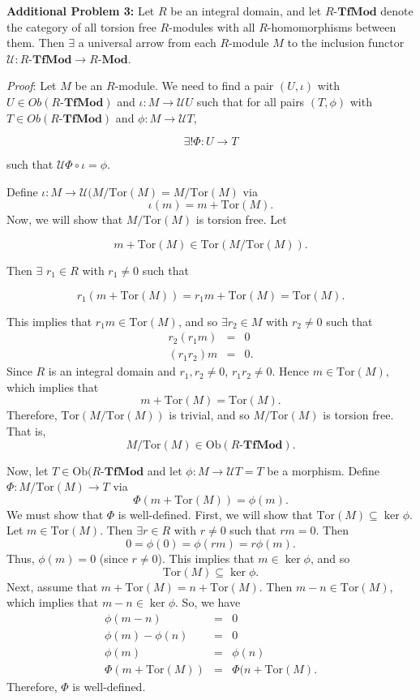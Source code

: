 \documentclass{article}
\newcommand{\Tor}{\textrm{Tor}}
\newcommand{\Ob}{\textrm{Ob}}
\begin{document}
\begin{flushleft}
\bigskip

\textbf{Additional Problem 3:} Let $R$ be an integral domain, and let $R\textrm{-}\mathbf{TfMod}$ denote the category of all torsion free $R$-modules with all $R$-homomorphisms between them.  Then $\exists$ a universal arrow from each $R$-module $M$ to the inclusion functor $\mathcal{U}:R\textrm{-}\mathbf{TfMod}\rightarrow R\textrm{-}\mathbf{Mod}$.

\medskip

\textit{Proof}: Let $M$ be an $R$-module.  We need to find a pair $(U,\iota)$ with $U \in 
Ob(R\textrm{-}\mathbf{TfMod})$ and $\iota:M\rightarrow\mathcal{U}U$ such that for all pairs $(T,\phi)$ with $T \in Ob(R\textrm{-}\mathbf{TfMod})$ and $\phi:M\rightarrow\mathcal{U}T$,

$$\exists!  \Phi:U\rightarrow T$$

such that $\mathcal{U}\Phi \circ \iota=\phi$.

\medskip

Define $\iota :M\rightarrow\mathcal{U}(M/\Tor(M)=M/\Tor(M)$ via 
$$\iota(m)=m+\Tor(M).$$
Now, we will show that $M/\Tor(M)$ is torsion free.  Let 

$$m+\Tor(M) \in \Tor(M/\Tor(M)).$$

 Then $\exists$ $r_1 \in R$ with $r_1\neq 0$ such that 
 
 $$r_1(m+\Tor(M))=r_1m+\Tor(M)=\Tor(M).$$
 
 This implies that $r_1m\in \Tor(M)$, and so $\exists r_2\in M$ with $r_2\neq 0$ such that 
 \begin{eqnarray*}
 r_2(r_1m)&=&0\\
 (r_1r_2)m&=&0.
 \end{eqnarray*}
 Since $R$ is an integral domain and $r_1,r_2\neq 0$, $r_1r_2\neq 0$.  Hence $m\in \Tor(M)$, which implies that
 $$m+\Tor(M)=\Tor(M).$$
 Therefore, $\Tor(M/\Tor(M))$ is trivial, and so $M/\Tor(M)$ is torsion free.  That is, 
 $$M/\Tor(M) \in \Ob(R\textrm{-}\mathbf{TfMod}).$$
 
 \medskip
 
 Now, let $T \in \Ob(R\textrm{-}\mathbf{TfMod}$ and let $\phi:M\rightarrow\mathcal{U}T=T$ be a morphism.  Define $\Phi:M/\Tor(M)\rightarrow T$ via
 $$\Phi(m+\Tor(M))=\phi(m).$$
 We must show that $\Phi$ is well-defined.  First, we will show that $\Tor(M)\subseteq \ker\phi$.  Let $m \in \Tor(M)$.  Then $\exists r \in R$ with $r\neq 0$ such that $rm=0$.  Then
 $$0=\phi(0)=\phi(rm)=r\phi(m).$$
 Thus, $\phi(m)=0$ (since $r\neq0$).  This implies that $m \in \ker\phi$, and so
 $$\Tor(M) \subseteq \ker\phi.$$
 Next, assume that $m+\Tor(M)=n+\Tor(M)$.  Then $m-n \in \Tor(M)$, which implies that $m-n \in \ker\phi$.  So, we have
  \begin{eqnarray*}
 \phi(m-n)&=&0\\
 \phi(m)-\phi(n)&=&0\\
 \phi(m)&=&\phi(n)\\
 \Phi(m+\Tor(M))&=&\Phi(n+\Tor(M).
 \end{eqnarray*}
 Therefore, $\Phi$ is well-defined.
 

\end{flushleft}
\end{document}
